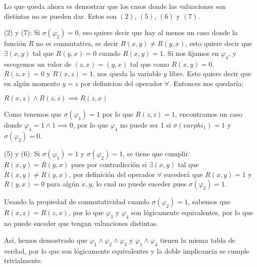 Lo que queda ahora es demostrar que los casos donde las valuaciones son distintas no se pueden dar. Estos son $(2)$, $(5)$, $(6)$ y $(7)$.

\begin{enumerate*}
    \item(2) y (7): Si $\sigma (\varphi_2) = 0$, eso quiere decir que hay al menos un caso donde la función $R$ no es conmutativa, es decir $R(x, y) \neq R(y, x)$, esto quiere decir que $\exists (x, y)$ tal que $R(y, x) = 0$ cuando $R(x, y) = 1$. Si nos fijamos en $\varphi_4$, y escogemos un valor de $(z, x) = (y, x)$ tal que como $R(x, y) = 0$, $R(z, x) = 0$ y $R(x, z) = 1$, nos queda la variable $y$ libre. Esto quiere decir que en algún momento $y = z$ por definicion del operador $\forall$. Entonces nos quedaría:
    
    \hspace{20mm} $R(x, z) \wedge R(z, z) \implies R(z, x)$
    
    Como tenemos que $\sigma (\varphi_1) = 1$ por lo que $R(z, z) = 1$, encontramos un caso donde $\varphi_4 = 1 \wedge 1 \implies 0$, por lo que $\varphi_4$ no puede ser 1 si $\sigma (varphi_1) = 1$ y $\sigma (\varphi_2) = 0$.
    
    \item(5) y (6): Si $\sigma (\varphi_1) = 1$ y $\sigma (\varphi_2) = 1$, se tiene que cumplir $R(x, y) = R(y, x)$ pues por contradicción si $\exists (x, y)$ tal que $R(x, y) \neq R(y, x)$, por definición del operador $\forall$ sucederá que $R(x, y) = 1$ y $R(y, x) = 0$ para algún $x, y$, lo cual no puede suceder pues $\sigma (\varphi_2) = 1$.
    
    Usando la propiedad de conmutatividad cuando $\sigma (\varphi_2) = 1$, sabemos que $R(x, z) = R(z, x)$, por lo que $\varphi_3$ y $\varphi_4$ son lógicamente equivalentes, por lo que no puede suceder que tengan valuaciones distintas.
    
    Así, hemos demostrado que $\varphi_1 \wedge \varphi_2 \wedge \varphi_3$ y $\varphi_1 \wedge \varphi_4$ tienen la misma tabla de verdad, por lo que son lógicamente equivalentes y la doble implicancia se cumple trivialmente.
    
\end{enumerate*}